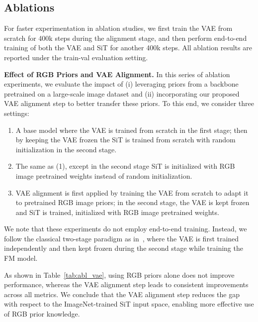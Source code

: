 \subsection{Ablations}

For faster experimentation in ablation studies, we first train the VAE from scratch for 400k steps during the alignment stage, and then perform end-to-end training of both the VAE and SiT for another 400k steps.
All ablation results are reported under the train-val evaluation setting.

\textbf{Effect of RGB Priors and VAE Alignment.} 
In this series of ablation experiments, we evaluate the impact of (i) leveraging priors from a backbone pretrained on a large-scale image dataset and (ii) incorporating our proposed VAE alignment step to better transfer these priors. To this end, we consider three settings: 

\begin{enumerate} 
    \item A base model where the VAE is trained from scratch in the first stage; then by keeping the VAE frozen the SiT is trained from scratch with random initialization in the second stage. 
    \item  The same as (1), except in the second stage SiT is initialized with RGB image pretrained weights instead of random initialization.
    \item VAE alignment is first applied by training the VAE from scratch to adapt it to pretrained RGB image priors; in the second stage, the VAE is kept frozen and SiT is trained, initialized with RGB image pretrained weights.
\end{enumerate} 

We note that these experiments do not employ end-to-end training. Instead, we follow the classical two-stage paradigm as in~\cite{ran_towards_2024,hu_rangeldm_2024}, where the VAE is first trained independently and then kept frozen during the second stage while training the FM model.

As shown in Table~\ref{tab:abl_vae}, using RGB priors alone does not improve performance, whereas the VAE alignment step leads to consistent improvements across all metrics. We conclude that the VAE alignment step reduces the gap with respect to the ImageNet-trained SiT input space, enabling more effective use of RGB prior knowledge. 



